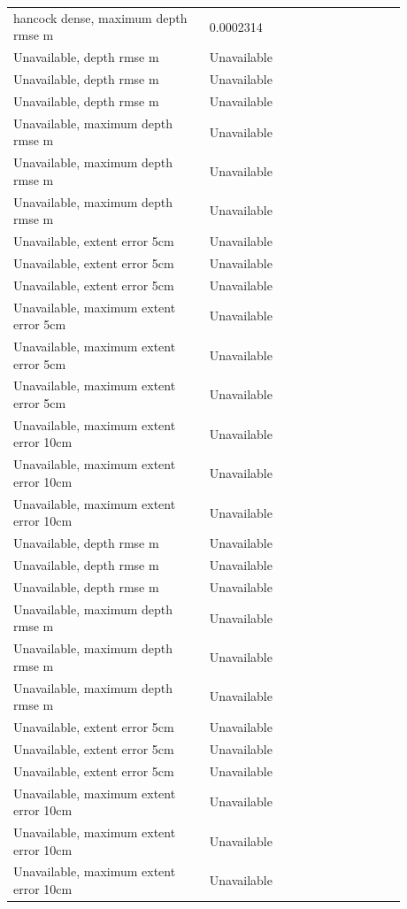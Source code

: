 \begin{longtable}{p{0.4400\linewidth}p{0.4400\linewidth}}
hancock dense, maximum depth rmse m & 0.0002314 \\
Unavailable, depth rmse m & Unavailable \\
Unavailable, depth rmse m & Unavailable \\
Unavailable, depth rmse m & Unavailable \\
Unavailable, maximum depth rmse m & Unavailable \\
Unavailable, maximum depth rmse m & Unavailable \\
Unavailable, maximum depth rmse m & Unavailable \\
Unavailable, extent error 5cm & Unavailable \\
Unavailable, extent error 5cm & Unavailable \\
Unavailable, extent error 5cm & Unavailable \\
Unavailable, maximum extent error 5cm & Unavailable \\
Unavailable, maximum extent error 5cm & Unavailable \\
Unavailable, maximum extent error 5cm & Unavailable \\
Unavailable, maximum extent error 10cm & Unavailable \\
Unavailable, maximum extent error 10cm & Unavailable \\
Unavailable, maximum extent error 10cm & Unavailable \\
Unavailable, depth rmse m & Unavailable \\
Unavailable, depth rmse m & Unavailable \\
Unavailable, depth rmse m & Unavailable \\
Unavailable, maximum depth rmse m & Unavailable \\
Unavailable, maximum depth rmse m & Unavailable \\
Unavailable, maximum depth rmse m & Unavailable \\
Unavailable, extent error 5cm & Unavailable \\
Unavailable, extent error 5cm & Unavailable \\
Unavailable, extent error 5cm & Unavailable \\
Unavailable, maximum extent error 10cm & Unavailable \\
Unavailable, maximum extent error 10cm & Unavailable \\
Unavailable, maximum extent error 10cm & Unavailable \\
\end{longtable}
\endgroup
